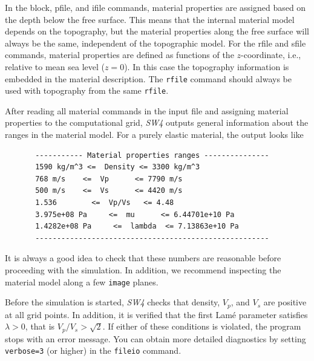 \documentclass[11pt]{report}
\begin{document}
In the block, pfile, and ifile commands, material properties are assigned based on the depth below
the free surface. This means that the internal material model depends on the topography, but the
material properties along the free surface will always be the same, independent of the topographic
model. For the rfile and sfile commands, material properties are defined as functions of the
$z$-coordinate, i.e., relative to mean sea level ($z=0$). In this case the topography information is
embedded in the material description. The {\tt rfile} command should always be used with topography
from the same {\tt rfile}. 


After reading all material commands in the input file and assigning material properties to the
computational grid, \emph{SW4} outputs general information about the ranges in the material
model. For a purely elastic material, the output looks like
\newpage
\begin{verbatim}
       ----------- Material properties ranges ---------------
       1590 kg/m^3 <=  Density <= 3300 kg/m^3
       768 m/s    <=  Vp      <= 7790 m/s
       500 m/s    <=  Vs      <= 4420 m/s
       1.536        <=  Vp/Vs   <= 4.48
       3.975e+08 Pa     <=  mu      <= 6.44701e+10 Pa
       1.4282e+08 Pa     <=  lambda  <= 7.13863e+10 Pa
       ------------------------------------------------------
\end{verbatim}
It is always a good idea to check that these numbers are reasonable before proceeding with the
simulation. In addition, we recommend inspecting the material model along a few \verb+image+ planes.

Before the simulation is started, \emph{SW4} checks that density, $V_p$, and $V_s$ are
positive at all grid points. In addition, it is verified that the first Lam\'e parameter satisfies
$\lambda>0$, that is $V_p/V_s > \sqrt{2}$. If either of these conditions is violated, the program
stops with an error message. You can obtain more detailed diagnostics by setting \verb+verbose=3+
(or higher) in the \verb+fileio+ command.
\end{document}
